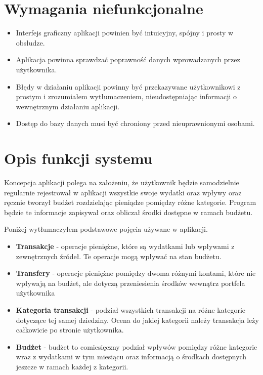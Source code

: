 \documentclass[shortabstract,inz]{iithesis}
\begin{document}
\section{Wymagania niefunkcjonalne}
\begin{itemize}
	\item Interfejs graficzny aplikacji powinien być intuicyjny, spójny i prosty w obsłudze.
	\item Aplikacja powinna sprawdzać poprawność danych wprowadzanych przez użytkownika.
	\item Błędy w działaniu aplikacji powinny być przekazywane użytkownikowi z prostym i zrozumiałem wytłumaczeniem, nieudostępniając informacji o wewnętrznym działaniu aplikacji.
	\item Dostęp do bazy danych musi być chroniony przed nieuprawnionymi osobami.
\end{itemize}
\section{Opis funkcji systemu}
Koncepcja aplikacji polega na założeniu, że użytkownik będzie samodzielnie regularnie rejestrował w aplikacji wszystkie swoje wydatki oraz wpływy oraz ręcznie tworzył budżet rozdzielając pieniądze pomiędzy różne kategorie. Program będzie te informacje zapisywał oraz obliczał środki dostępne w ramach budżetu.

Poniżej wytłumaczyłem podstawowe pojęcia używane w aplikacji.
\begin{itemize}
	\item \textbf{Transakcje} - operacje pieniężne, które są wydatkami lub wpływami z zewnętrznych źródeł. Te operacje mogą wpływać na stan budżetu.
	\item \textbf{Transfery} - operacje pieniężne pomiędzy dwoma różnymi kontami, które nie wpływają na budżet, ale dotyczą przeniesienia środków wewnątrz portfela użytkownika
		\item \textbf{Kategoria transakcji} - podział wszystkich transakcji na różne kategorie dotyczące tej samej dziedziny. Ocena do jakiej kategorii należy transakcja leży całkowicie po stronie użytkownika.
	\item \textbf{Budżet} - budżet to comiesięczny podział wpływów pomiędzy różne kategorie wraz z wydatkami w tym miesiącu oraz informacją o środkach dostępnych jeszcze w ramach każdej z kategorii.

\end{itemize}
\end{document}

